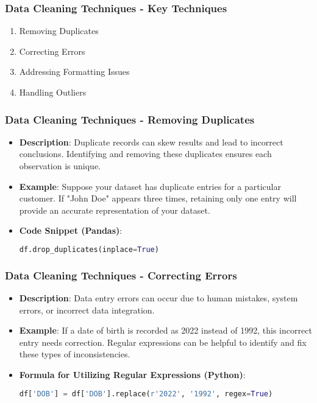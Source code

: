 \documentclass[aspectratio=169]{beamer}
\begin{document}
\begin{frame}[fragile]
    \frametitle{Data Cleaning Techniques - Key Techniques}
    \begin{enumerate}
        \item Removing Duplicates
        \item Correcting Errors
        \item Addressing Formatting Issues
        \item Handling Outliers
    \end{enumerate}
\end{frame}

\begin{frame}[fragile]
    \frametitle{Data Cleaning Techniques - Removing Duplicates}
    \begin{itemize}
        \item \textbf{Description}: Duplicate records can skew results and lead to incorrect conclusions. Identifying and removing these duplicates ensures each observation is unique.
        \item \textbf{Example}: Suppose your dataset has duplicate entries for a particular customer. If "John Doe" appears three times, retaining only one entry will provide an accurate representation of your dataset.
        \item \textbf{Code Snippet (Pandas)}:
        \begin{lstlisting}[language=python]
df.drop_duplicates(inplace=True)
        \end{lstlisting}
    \end{itemize}
\end{frame}

\begin{frame}[fragile]
    \frametitle{Data Cleaning Techniques - Correcting Errors}
    \begin{itemize}
        \item \textbf{Description}: Data entry errors can occur due to human mistakes, system errors, or incorrect data integration.
        \item \textbf{Example}: If a date of birth is recorded as 2022 instead of 1992, this incorrect entry needs correction. Regular expressions can be helpful to identify and fix these types of inconsistencies.
        \item \textbf{Formula for Utilizing Regular Expressions (Python)}:
        \begin{lstlisting}[language=python]
df['DOB'] = df['DOB'].replace(r'2022', '1992', regex=True)
        \end{lstlisting}
    \end{itemize}
\end{frame}
\end{document}
